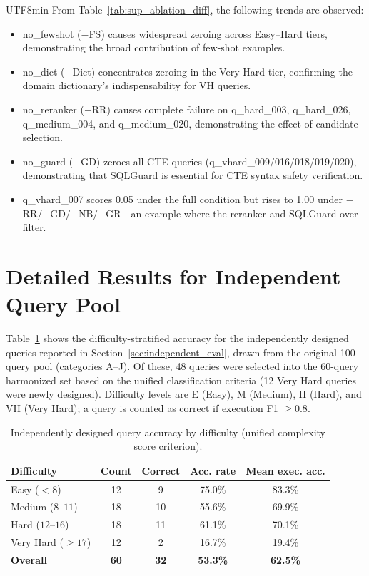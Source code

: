 \documentclass[sn-mathphys,Numbered]{sn-jnl}
\begin{document}
\begin{CJK}{UTF8}{min}
From Table~\ref{tab:sup_ablation_diff}, the following trends are
observed:
\begin{itemize}
  \item no\_fewshot ($-$FS) causes widespread zeroing across
    Easy--Hard tiers, demonstrating the broad contribution of
    few-shot examples.
  \item no\_dict ($-$Dict) concentrates zeroing in the Very Hard
    tier, confirming the domain dictionary's indispensability for
    VH queries.
  \item no\_reranker ($-$RR) causes complete failure on
    q\_hard\_003, q\_hard\_026, q\_medium\_004, and
    q\_medium\_020, demonstrating the effect of candidate
    selection.
  \item no\_guard ($-$GD) zeroes all CTE queries
    (q\_vhard\_009/016/018/019/020), demonstrating that SQLGuard
    is essential for CTE syntax safety verification.
  \item q\_vhard\_007 scores 0.05 under the full condition but
    rises to 1.00 under $-$RR/$-$GD/$-$NB/$-$GR---an example
    where the reranker and SQLGuard over-filter.
\end{itemize}

\section{Detailed Results for Independent Query Pool}
\label{sec:sup_expert_queries}

Table~\ref{tab:sup_expert_category} shows the difficulty-stratified
accuracy for the independently designed queries reported in
Section~\ref{sec:independent_eval}, drawn from the original
100-query pool (categories A--J).
Of these, 48 queries were selected into the 60-query harmonized
set based on the unified classification criteria (12 Very Hard
queries were newly designed).
Difficulty levels are E (Easy), M (Medium), H (Hard), and VH
(Very Hard); a query is counted as correct if execution
F1 $\geq 0.8$.

\begin{table}[htbp]
  \centering
  \caption{Independently designed query accuracy by difficulty (unified complexity score criterion).}
  \label{tab:sup_expert_category}
  \small
  \begin{tabular}{lcccc}
    \toprule
    Difficulty & Count & Correct & Acc. rate & Mean exec. acc. \\
    \midrule
    Easy ($< 8$) & 12 & 9 & 75.0\% & 83.3\% \\
    Medium ($8$--$11$) & 18 & 10 & 55.6\% & 69.9\% \\
    Hard ($12$--$16$) & 18 & 11 & 61.1\% & 70.1\% \\
    Very Hard ($\geq 17$) & 12 & 2 & 16.7\% & 19.4\% \\
    \midrule
    \textbf{Overall} & \textbf{60} & \textbf{32} & \textbf{53.3\%} & \textbf{62.5\%} \\
    \bottomrule
  \end{tabular}
\end{table}


\end{CJK}
\end{document}
